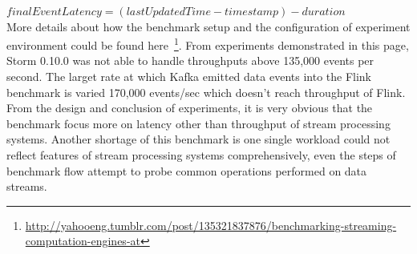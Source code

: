$finalEventLatency = (lastUpdatedTime - timestamp) - duration$ \\

More details about how the benchmark setup and the configuration of experiment environment could be found here~\footnote{\url{http://yahooeng.tumblr.com/post/135321837876/benchmarking-streaming-computation-engines-at}}. From experiments demonstrated in this page, Storm 0.10.0 was not able to handle throughputs above 135,000 events per second. The larget rate at which Kafka emitted data events into the Flink benchmark is varied 170,000 events/sec which doesn't reach throughput of Flink. From the design and conclusion of experiments, it is very obvious that the benchmark focus more on latency other than throughput of stream processing systems. Another shortage of this benchmark is one single workload could not reflect features of stream processing systems comprehensively, even the steps of benchmark flow attempt to probe common operations performed on data streams.


\clearpage
